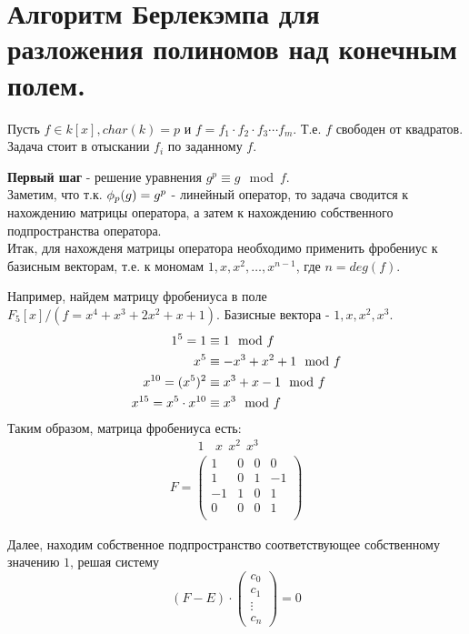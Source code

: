 \section{Алгоритм Берлекэмпа для разложения полиномов над конечным полем.}

Пусть $f \in k[x], char(k) = p$ и $f = f_1 \cdot f_2 \cdot f_3 \cdots f_m$. Т.е. $f$ свободен от квадратов. \\
Задача стоит в отыскании $f_i$ по заданному $f$.

\textbf{Первый шаг} - решение уравнения $g^p \equiv g \mod f$.\\
Заметим, что т.к. $\phi_{p}(g) = g^p$ - линейный оператор, то задача сводится к нахождению матрицы оператора, а затем к
нахождению собственного подпространства оператора. \\
Итак, для нахожденя матрицы оператора необходимо применить фробениус к базисным векторам, т.е. к мономам $1, x, x^2,
\dots, x^{n - 1}$, где $n = deg(f)$.

Например, найдем матрицу фробениуса в поле $F_5[x] / (f = x^4+x^3+2x^2+x+1)$. Базисные вектора - $1, x, x^2, x^3$.
\begin{align}
1^5 = 1 &\equiv 1 \mod f \notag \\
x^5 &\equiv -x^3 + x^2 + 1 \mod f \notag \\
x^{10} = (x^5)^2 &\equiv x^3 + x - 1 \mod f \notag \\
x^{15} = x^5 \cdot x^{10} &\equiv x^3 \mod f \notag 
\end{align}
Таким образом, матрица фробениуса есть:
\[
\begin{array}{l}
~~~~~~~~~~1~~~~x~~x^2~~x^3 \\
F = 
\begin{pmatrix}
1 & 0 & 0 & 0 \\
1 & 0 & 1 & -1 \\
-1 & 1 & 0 & 1 \\
0 & 0 & 0 & 1 \\ 
\end{pmatrix}
\end{array}
\]

Далее, находим собственное подпространство соответствующее собственному значению $1$, решая систему 
\[(F - E) \cdot \begin{pmatrix} c_0 \\ c_1\\ \vdots \\ c_n \end{pmatrix} = 0\]


